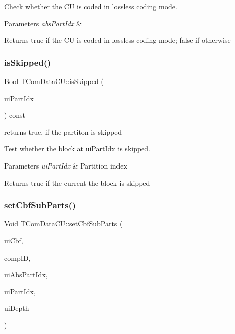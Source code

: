 Check whether the CU is coded in lossless coding mode. 
\begin{DoxyParams}{Parameters}
{\em abs\+Part\+Idx} & \\
\hline
\end{DoxyParams}
\begin{DoxyReturn}{Returns}
true if the CU is coded in lossless coding mode; false if otherwise 
\end{DoxyReturn}
\mbox{\label{class_t_com_data_c_u_a301d22fe94ab54f1422865deaea26c35}} 
\subsubsection{\texorpdfstring{is\+Skipped()}{isSkipped()}}
{\footnotesize\ttfamily Bool T\+Com\+Data\+C\+U\+::is\+Skipped (\begin{DoxyParamCaption}\item[{U\+Int}]{ui\+Part\+Idx }\end{DoxyParamCaption}) const}



returns true, if the partiton is skipped 

Test whether the block at ui\+Part\+Idx is skipped. 
\begin{DoxyParams}{Parameters}
{\em ui\+Part\+Idx} & Partition index \\
\hline
\end{DoxyParams}
\begin{DoxyReturn}{Returns}
true if the current the block is skipped 
\end{DoxyReturn}
\mbox{\label{class_t_com_data_c_u_a796f6a0d1263e828d8b66a24513f763a}} 
\subsubsection{\texorpdfstring{set\+Cbf\+Sub\+Parts()}{setCbfSubParts()}}
{\footnotesize\ttfamily Void T\+Com\+Data\+C\+U\+::set\+Cbf\+Sub\+Parts (\begin{DoxyParamCaption}\item[{U\+Int}]{ui\+Cbf,  }\item[{Component\+ID}]{comp\+ID,  }\item[{U\+Int}]{ui\+Abs\+Part\+Idx,  }\item[{U\+Int}]{ui\+Part\+Idx,  }\item[{U\+Int}]{ui\+Depth }\end{DoxyParamCaption})}

